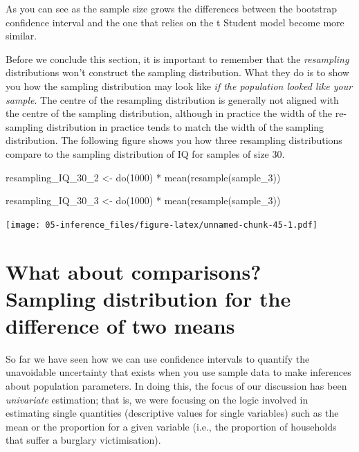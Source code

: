 \documentclass[
]{book}
\newenvironment{Shaded}{\begin{snugshade}}{\end{snugshade}}
\newcommand{\DecValTok}[1]{\textcolor[rgb]{0.00,0.00,0.81}{#1}}
\newcommand{\FunctionTok}[1]{\textcolor[rgb]{0.00,0.00,0.00}{#1}}
\newcommand{\NormalTok}[1]{#1}
\newcommand{\OtherTok}[1]{\textcolor[rgb]{0.56,0.35,0.01}{#1}}
\newcommand{\SpecialCharTok}[1]{\textcolor[rgb]{0.00,0.00,0.00}{#1}}
\begin{document}
As you can see as the sample size grows the differences between the bootstrap confidence interval and the one that relies on the t Student model become more similar.

Before we conclude this section, it is important to remember that the \emph{resampling} distributions won't construct the sampling distribution. What they do is to show you how the sampling distribution may look like \emph{if the population looked like your sample}. The centre of the resampling distribution is generally not aligned with the centre of the sampling distribution, although in practice the width of the re-sampling distribution in practice tends to match the width of the sampling distribution. The following figure shows you how three resampling distributions compare to the sampling distribution of IQ for samples of size 30.

\begin{Shaded}
\begin{Highlighting}[]
\NormalTok{resampling\_IQ\_30\_2 }\OtherTok{\textless{}{-}} \FunctionTok{do}\NormalTok{(}\DecValTok{1000}\NormalTok{) }\SpecialCharTok{*} \FunctionTok{mean}\NormalTok{(}\FunctionTok{resample}\NormalTok{(sample\_3))}
\end{Highlighting}
\end{Shaded}

\begin{Shaded}
\begin{Highlighting}[]
\NormalTok{resampling\_IQ\_30\_3 }\OtherTok{\textless{}{-}} \FunctionTok{do}\NormalTok{(}\DecValTok{1000}\NormalTok{) }\SpecialCharTok{*} \FunctionTok{mean}\NormalTok{(}\FunctionTok{resample}\NormalTok{(sample\_3))}
\end{Highlighting}
\end{Shaded}

\texttt{[image: 05-inference\_files/figure-latex/unnamed-chunk-45-1.pdf]}

\hypertarget{what-about-comparisons-sampling-distribution-for-the-difference-of-two-means}{%
\section{What about comparisons? Sampling distribution for the difference of two means}\label{what-about-comparisons-sampling-distribution-for-the-difference-of-two-means}}

So far we have seen how we can use confidence intervals to quantify the unavoidable uncertainty that exists when you use sample data to make inferences about population parameters. In doing this, the focus of our discussion has been \emph{univariate} estimation; that is, we were focusing on the logic involved in estimating single quantities (descriptive values for single variables) such as the mean or the proportion for a given variable (i.e., the proportion of households that suffer a burglary victimisation).
\end{document}
